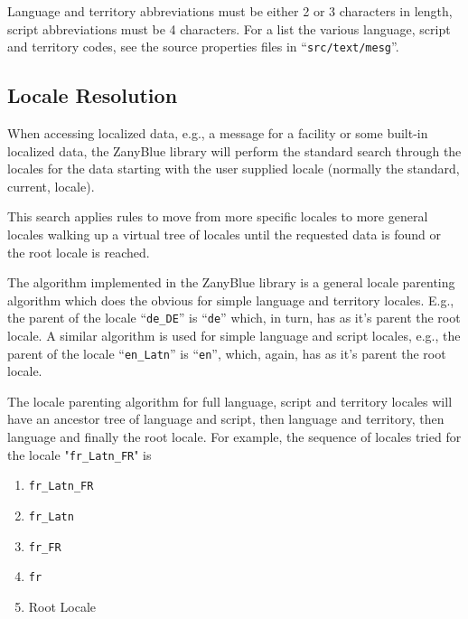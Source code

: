 Language and territory abbreviations must be either 2 or 3 characters in length,
script abbreviations must be 4 characters.  For a list the various language,
script and territory codes, see the source properties files in
``\texttt{src/text/mesg}''.

\subsection{Locale Resolution}

When accessing localized data, e.g., a message for a facility or some built-in
localized data, the ZanyBlue library will perform the standard search through
the locales for the data starting with the user supplied locale (normally the
standard, current, locale).

This search applies rules to move from more specific locales to more general
locales walking up a virtual tree of locales until the requested data is found
or the root locale is reached.

The algorithm implemented in the ZanyBlue library is a general locale
parenting algorithm which does the obvious for simple language and territory
locales.  E.g., the parent of the locale ``\texttt{de\_DE}'' is ``\texttt{de}''
which, in turn, has as it's parent the root locale.  A similar algorithm is
used for simple language and script locales, e.g., the parent of the locale
``\texttt{en\_Latn}'' is ``\texttt{en}'', which, again, has as it's parent
the root locale.

The locale parenting algorithm for full language, script and territory
locales will have an ancestor tree of language and script, then language
and territory, then language and finally the root locale.  For example,
the sequence of locales tried for the locale "\texttt{fr\_Latn\_FR}" is
\begin{enumerate}
\item \texttt{fr\_Latn\_FR}
\item \texttt{fr\_Latn}
\item \texttt{fr\_FR}
\item \texttt{fr}
\item Root Locale
\end{enumerate}

